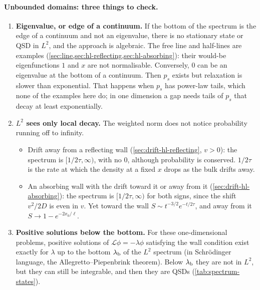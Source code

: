 \documentclass[11pt]{article}
\numberwithin{equation}{section}
\begin{document}
\paragraph{Unbounded domains: three things to check.}
\begin{enumerate}
  \item \textbf{Eigenvalue, or edge of a continuum.} If the bottom of the spectrum is the edge of a continuum
        and not an eigenvalue, there is no stationary state or QSD in $L^2$, and the approach is algebraic. The
        free line and half-lines are examples (\cref{sec:line,sec:hl-reflecting,sec:hl-absorbing}): their
        would-be eigenfunctions $1$ and $x$ are not normalisable. Conversely, $0$ can be an eigenvalue at the
        bottom of a continuum. Then $p_s$ exists but relaxation is slower than exponential. That happens when
        $p_s$ has power-law tails, which none of the examples here do; in one dimension a gap needs tails of
        $p_s$ that decay at least exponentially.
  \item \textbf{$L^2$ sees only local decay.} The weighted norm does not notice probability running off to
        infinity.
        \begin{itemize}
          \item Drift away from a reflecting wall (\cref{sec:drift-hl-reflecting}, $v>0$): the spectrum is
                $[1/2\tau,\infty)$, with no $0$, although probability is conserved. $1/2\tau$ is the rate at
                which the density at a fixed $x$ drops as the bulk drifts away.
          \item An absorbing wall with the drift toward it or away from it (\cref{sec:drift-hl-absorbing}): the
                spectrum is $[1/2\tau,\infty)$ for both signs, since the shift $v^2/2D$ is even in $v$. Yet
                toward the wall $S\sim t^{-3/2}e^{-t/2\tau}$, and away from it $S\to1-e^{-2x_0/\ell}$.
        \end{itemize}
  \item \textbf{Positive solutions below the bottom.} For these one-dimensional problems, positive solutions of
        $\mathcal L\phi=-\lambda\phi$ satisfying the wall condition exist exactly for $\lambda$ up to the bottom
        $\lambda_{\rm b}$ of the $L^2$ spectrum (in Schr\"odinger language, the Allegretto--Piepenbrink
        theorem). Below $\lambda_{\rm b}$ they are not in $L^2$, but they can still be integrable, and then they
        are QSDs (\cref{tab:spectrum-states}).
\end{enumerate}
\end{document}
